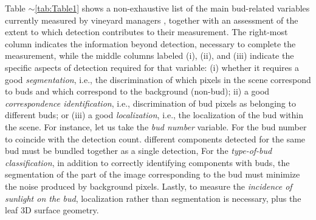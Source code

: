 \documentclass[a4paper,authoryear,review]{elsarticle}
\begin{document}
	Table $\sim$\ref{tab:Table1} shows a non-exhaustive list of the main bud-related variables currently measured by vineyard managers \citep{sanchez2005bud, noyce2016basis, collins2020effects}, together with an assessment of the extent to which detection contributes to their measurement. The right-most column indicates the information beyond detection, necessary to complete the measurement, while the middle columns labeled (i), (ii), and (iii) indicate the specific aspects of detection required for that variable: (i) whether it requires a good  \emph{segmentation}, i.e., the discrimination of which pixels in the scene correspond to buds and which correspond to the background (non-bud); ii) a good \emph{correspondence identification}, i.e., discrimination of bud pixels as belonging to different buds; or (iii) a good \emph{localization}, i.e., the localization of the bud within the scene.
	For instance, let us take the \emph{bud number} variable. For the bud number to coincide with the detection count.  different components detected for the same bud must be bundled together as a single detection, For the \emph{type-of-bud classification}, in addition to correctly identifying components with buds, the segmentation of the part of the image corresponding to the bud must minimize the noise produced by background pixels. Lastly, to measure the \emph{incidence of sunlight on the bud}, localization rather than segmentation is necessary, plus the  leaf 3D surface geometry.
	
\end{document}
